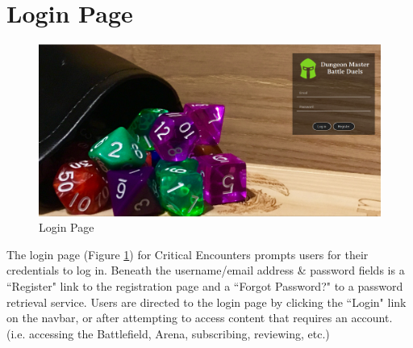 \documentclass[12pt,a4paper]{report}
\begin{document}
	\section{Login Page}
	\begin{figure}[H]
		\centering
		\includegraphics[scale=.20]{login}
		\caption{Login Page}
		\label{fig: Login Page}
	\end{figure}
	The login page (Figure \ref{fig: Login Page}) for Critical Encounters prompts users for their credentials to log in. Beneath the username/email address \& password fields is a ``Register" link to the registration page and a ``Forgot Password?" to a password retrieval service. Users are directed to the login page by clicking the ``Login" link on the navbar, or after attempting to access content that requires an account. (i.e. accessing the Battlefield, Arena, subscribing, reviewing, etc.)
	\newpage
\end{document}
